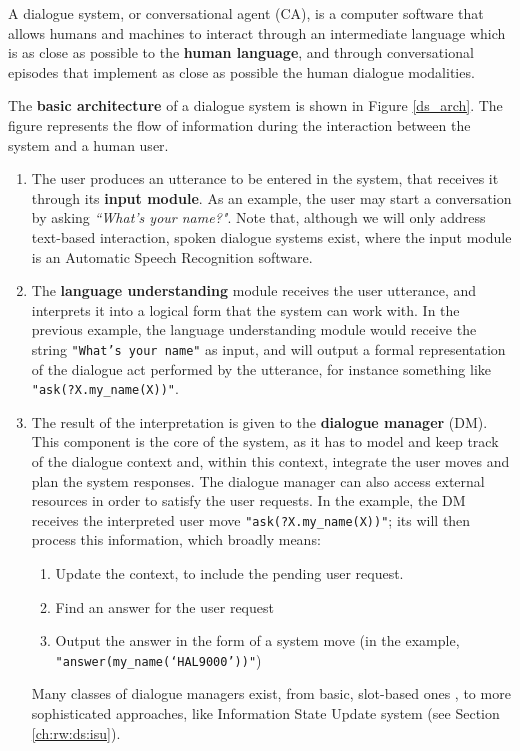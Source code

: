 A dialogue system, or conversational agent (CA), is a computer software that allows humans and machines to interact through an intermediate language which is as close as possible to the \textbf{human language}, and through conversational episodes that implement as close as possible the human dialogue modalities.

The \textbf{basic architecture} of a dialogue system is shown in Figure \ref{ds_arch}. The figure represents the flow of information during the interaction between the system and a human user.

 \begin{enumerate}
	\item The user produces an utterance to be entered in the system, that receives it through its \textbf{input module}. As an example, the user may start a conversation by asking \textit{``What's your name?"}. Note that, although we will only address text-based interaction, spoken dialogue systems exist, where the input module is an Automatic Speech Recognition software.
	\item The \textbf{language understanding} module receives the user utterance, and interprets it into a logical form that the system can work with. In the previous example, the language understanding module would receive the string \texttt{"What's your name"} as input, and will output a formal representation of the dialogue act performed by the utterance, for instance something like \texttt{"ask(?X.my\_name(X))"}.
	\item The result of the interpretation is given to the \textbf{dialogue manager} (DM). This component is the core of the system, as it has to model and keep track of the dialogue context and, within this context, integrate the user moves and plan the system responses. The dialogue manager can also access external resources in order to satisfy the user requests. In the example, the DM receives the interpreted user move \texttt{"ask(?X.my\_name(X))"}; its will then process this information, which broadly means:
	\begin{enumerate}
		\item Update the context, to include the pending user request.
		\item Find an answer for the user request
		\item Output the answer in the form of a system move (in the example, \\ \texttt{"answer(my\_name(`HAL9000'))"})
	\end{enumerate}
	Many classes of dialogue managers exist, from basic, slot-based ones \citep{Jokinen2009}, to more sophisticated approaches, like Information State Update system (see Section \ref{ch:rw:ds:isu}).

\end{enumerate}
